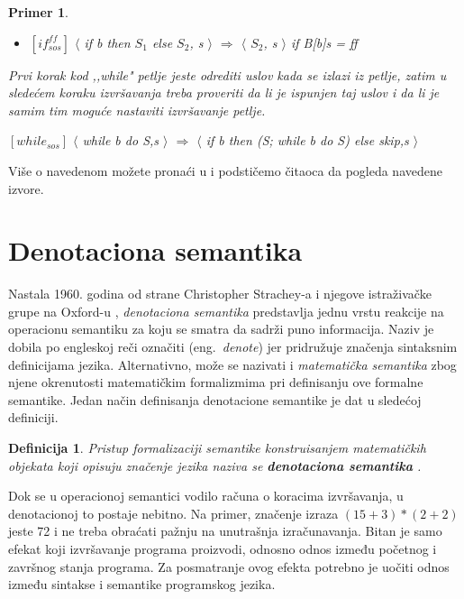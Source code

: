 \documentclass[a4paper]{article}
\newtheorem{primer}{Primer}[section]
\newtheorem{definicija}{Definicija}[section]
\begin{document}
{\begin{primer}
\begin{itemize}
	\item $[if^{ff}_{sos}]$ $\langle$ if b then $S_1$ else $S_2$, s $\rangle$ $\Longrightarrow$ $\langle$ $S_2$, s $\rangle$ \hspace{1cm} if B[b]s = ff
\end{itemize}
Prvi korak kod ,,while" petlje jeste odrediti uslov kada se izlazi iz petlje, zatim u sledećem koraku izvršavanja treba proveriti da li je ispunjen taj uslov i da li je samim tim moguće nastaviti izvršavanje petlje.
\begin{center} $[while_{sos}]$ $\langle$ while b do S,s $\rangle$ $\Longrightarrow$ $\langle$ if b then (S; while b do S) else skip,s $\rangle$ \end{center}
\end{primer}
Više o navedenom možete pronaći u \cite{willey} i podstičemo čitaoca da pogleda navedene izvore.

\section{Denotaciona semantika}
\label{sec:densem}

\qquad Nastala 1960. godina od strane Christopher Strachey-a i njegove istraživačke grupe na Oxford-u \cite{slonneger1995book}, \textit{denotaciona semantika} predstavlja jednu vrstu reakcije na operacionu semantiku za koju se smatra da sadrži puno informacija. Naziv je dobila po engleskoj reči označiti (eng.~{\em denote}) jer pridružuje značenja sintaksnim definicijama jezika. Alternativno, može se nazivati i \textit{matematička semantika} zbog njene okrenutosti matematičkim formalizmima pri definisanju ove formalne semantike. Jedan način definisanja denotacione semantike je dat u sledećoj definiciji.
\begin{definicija}
Pristup formalizaciji semantike konstruisanjem matematičkih objekata koji
opisuju značenje jezika naziva se \textbf{denotaciona semantika} \cite{milena}.
\end{definicija}

Dok se u operacionoj semantici vodilo računa o koracima izvršavanja, u denotacionoj to postaje nebitno. Na primer, značenje izraza $ (15+3)*(2+2) $ jeste 72 i ne treba obraćati pažnju na unutrašnja izračunavanja. Bitan je samo efekat koji izvršavanje programa proizvodi, odnosno odnos između početnog i završnog stanja programa. Za posmatranje ovog efekta potrebno je uočiti odnos između sintakse i semantike programskog jezika.

}
\end{document}
